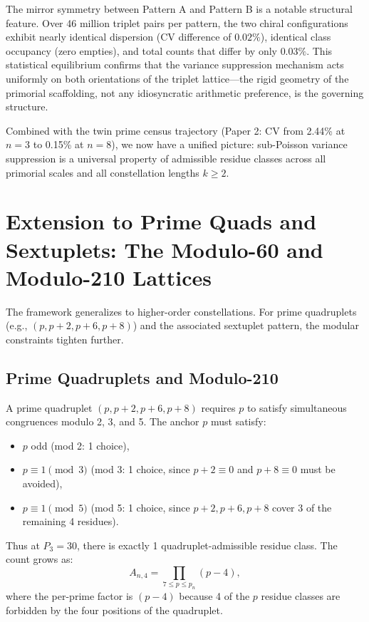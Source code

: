 \documentclass[11pt]{article}
\begin{document}
The mirror symmetry between Pattern A and Pattern B is a notable structural feature. Over 46 million triplet pairs per pattern, the two chiral configurations exhibit nearly identical dispersion (CV difference of $0.02\%$), identical class occupancy (zero empties), and total counts that differ by only $0.03\%$. This statistical equilibrium confirms that the variance suppression mechanism acts uniformly on both orientations of the triplet lattice---the rigid geometry of the primorial scaffolding, not any idiosyncratic arithmetic preference, is the governing structure.

Combined with the twin prime census trajectory (Paper 2: CV from 2.44\% at $n=3$ to 0.15\% at $n=8$), we now have a unified picture: sub-Poisson variance suppression is a universal property of admissible residue classes across all primorial scales and all constellation lengths $k \geq 2$.

\section{Extension to Prime Quads and Sextuplets: The Modulo-60 and Modulo-210 Lattices}

The framework generalizes to higher-order constellations. For prime quadruplets (e.g., $(p, p+2, p+6, p+8)$) and the associated sextuplet pattern, the modular constraints tighten further.

\subsection{Prime Quadruplets and Modulo-210}

A prime quadruplet $(p, p+2, p+6, p+8)$ requires $p$ to satisfy simultaneous congruences modulo 2, 3, and 5. The anchor $p$ must satisfy:
\begin{itemize}
  \item $p$ odd (mod 2: 1 choice),
  \item $p \equiv 1 \pmod 3$ (mod 3: 1 choice, since $p+2 \equiv 0$ and $p+8 \equiv 0$ must be avoided),
  \item $p \equiv 1 \pmod 5$ (mod 5: 1 choice, since $p+2, p+6, p+8$ cover 3 of the remaining 4 residues).
\end{itemize}
Thus at $P_3 = 30$, there is exactly 1 quadruplet-admissible residue class. The count grows as:
\begin{equation}
    A_{n,4} = \prod_{7 \le p \le p_n} (p-4),
\end{equation}
where the per-prime factor is $(p-4)$ because 4 of the $p$ residue classes are forbidden by the four positions of the quadruplet.
\end{document}
